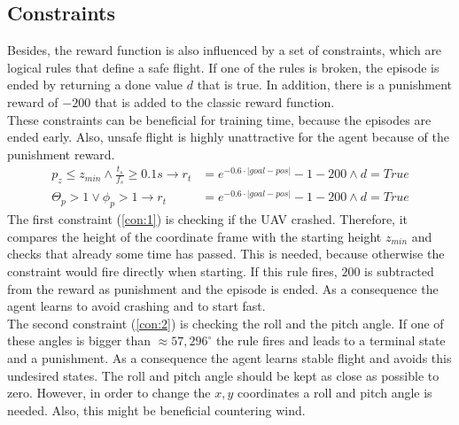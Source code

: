 \subsection{Constraints}\label{sec:constraint}
Besides, the reward function is also influenced by a set of constraints, which are logical rules that define a safe flight. 
If one of the rules is broken, the episode is ended by returning a done value $d$ that is true. 
In addition, there is a punishment reward of $-200$ that is added to the classic reward function.\\
These constraints can be beneficial for training time, because the episodes are ended early. 
Also, unsafe flight is highly unattractive for the agent because of the punishment reward. 
\begin{align}
	p_{z} \leq z_{min} \land \frac{t_s}{f_s} \geq 0.1 s \to r_t &= e^{-0.6 \cdot |goal - pos|} - 1 -200 \land d = True \label{con:1}\\
	\Theta_p > 1 \lor \phi_p > 1 \to r_t &= e^{-0.6 \cdot |goal - pos|} - 1 -200 \land d = True \label{con:2}
\end{align}
The first constraint (\cref{con:1}) is checking if the UAV crashed. 
Therefore, it compares the height of the coordinate frame with the starting height $z_{min}$ and checks that already some time has passed. 
This is needed, because otherwise the constraint would fire directly when starting. 
If this rule fires, $200$ is subtracted from the reward as punishment and the episode is ended. 
As a consequence the agent learns to avoid crashing and to start fast.\\
The second constraint (\cref{con:2}) is checking the roll and the pitch angle. 
If one of these angles is bigger than $\approx 57,296^{\circ}$ the rule fires and leads to a terminal state and a punishment. 
As a consequence the agent learns stable flight and avoids this undesired states. The roll and pitch angle should be kept as close as possible to zero. 
However, in order to change the $x,y$ coordinates a roll and pitch angle is needed. Also, this might be beneficial countering wind.

\newpage

